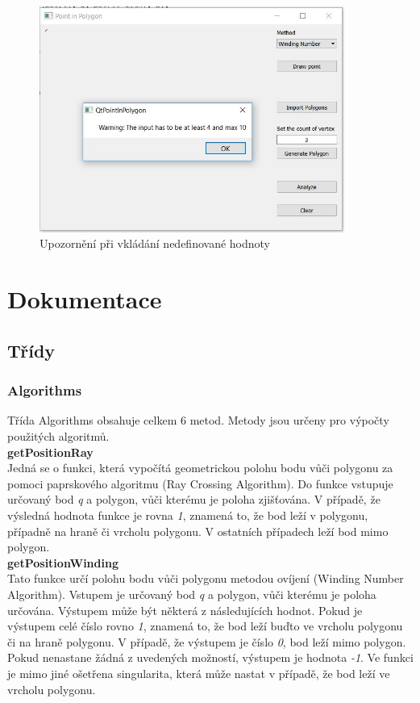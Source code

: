\documentclass[a4paper, 12pt]{article}
\begin{document}
\begin{figure}[h!]
	\centering
	\includegraphics[width=10cm]{warning.jpg}
	\caption{Upozornění při vkládání nedefinované hodnoty}
\end{figure}

\clearpage

\section{Dokumentace}
\subsection{Třídy}
\subsubsection{Algorithms}
Třída Algorithms obsahuje celkem 6 metod. Metody jsou určeny pro výpočty použitých algoritmů.
\\

\textbf{getPositionRay}\\
Jedná se o funkci, která vypočítá geometrickou polohu bodu vůči polygonu za pomoci paprskového algoritmu (Ray Crossing Algorithm). Do funkce vstupuje určovaný bod \textit{q} a polygon, vůči kterému je poloha zjišťována. V případě, že výsledná hodnota funkce je rovna \textit{1}, znamená to, že bod leží v polygonu, případně na hraně či vrcholu polygonu. V ostatních případech leží bod mimo polygon.\\

\textbf{getPositionWinding}\\
Tato funkce určí polohu bodu vůči polygonu metodou ovíjení (Winding Number Algorithm). Vstupem je určovaný bod \textit{q} a polygon, vůči kterému je poloha určována. Výstupem může být některá z následujících hodnot. Pokud je výstupem celé číslo rovno \textit{1}, znamená to, že bod leží buďto ve vrcholu polygonu či na hraně polygonu. V případě, že výstupem je číslo \textit{0}, bod leží mimo polygon. Pokud nenastane žádná z uvedených možností, výstupem je hodnota \textit{-1}. Ve funkci je mimo jiné ošetřena singularita, která může nastat v případě, že bod leží ve vrcholu polygonu.\\
\end{document}
